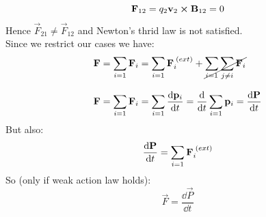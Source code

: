 \begin{equation}
    \vb{F}_{12} = q_2\vb{v}_2\cross\vb{B}_{12} = 0
\end{equation}
Hence $\vec{F}_{21} \neq \vec{F}_{12}$ and Newton's thrid law is not satisfied.\\
Since we restrict our cases we have:
\begin{equation}
    \begin{split}
      \vb{F} &= \displaystyle\sum_{i=1}\vb{F}_i = \displaystyle\sum_{i=1}\vb{F}_i^{\;(ext)} + \cancel{\displaystyle\sum_{i=1}\displaystyle\sum_{j\neq i}\vb{F}_i} \\[8pt]
      \vb{F} &= \displaystyle\sum_{i=1}\vb{F}_i = \displaystyle\sum_{i=1}\dfrac{\dd{\vb{p}_i}}{\dd{t}} = \dfrac{\dd{}}{\dd{t}}\displaystyle\sum_{i=1}\vb{p}_i = \dfrac{\dd{\vb{P}}}{\dd{t}}
    \end{split}
\end{equation}
But also:
\begin{equation}
    \dfrac{\dd{\vb{P}}}{\dd{t}} = \displaystyle\sum_{i=1}\vb{F}_i^{\;(ext)}
\end{equation}
So (only if weak action law holds):
\begin{equation}
    \vec{F} = \dfrac{\dd{\vec{P}}}{\dd{t}}
\end{equation}
